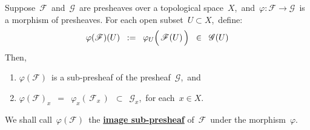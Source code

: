 \vskip 1.0cm
\begin{proposition}
\mbox{}\vskip 0.1cm
\noindent
Suppose \,$\mathscr{F}$\, and \,$\mathscr{G}$\, are presheaves over a topological space \,$X$,\,
and \,$\varphi : \mathscr{F} \longrightarrow \mathscr{G}$\, is a morphism of presheaves.
For each open subset \,$U \subset X$,\, define:
\begin{equation*}
\varphi(\mathscr{F})(U)
\;\; := \;\;
	\varphi_{U}\!\left(\,\overset{{\color{white}.}}{\mathscr{F}(U)}\,\right)
\;\; \in \;\;
	\mathscr{G}(U)
\end{equation*}
Then,
\begin{enumerate}
\item
	$\varphi(\mathscr{F})$\, is a sub-presheaf of the presheaf \,$\mathscr{G}$,\, and
\item
	$\varphi(\mathscr{F})_{x}$ \,$=$\, $\varphi_{x}\!\left(\,\mathscr{F}_{x}\,\right)$ \,$\subset$\, $\mathscr{G}_{x}$,\,
	for each \,$x \in X$.
\end{enumerate}
We shall call \,$\varphi(\mathscr{F})$\, the \underline{\textbf{image sub-presheaf}} of \,$\mathscr{F}$\,
under the morphism \,$\varphi$.
\end{proposition}
\proof
